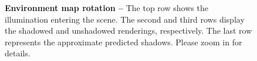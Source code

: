 \begin{figure}[!t]
  \centering
  \rotatingfigure
  \caption{\textbf{Environment map rotation --}
    The top row shows the illumination entering the scene.
    The second and third rows display the shadowed and unshadowed renderings,
    respectively.
    The last row represents the approximate predicted shadows.
    Please zoom in for details.
  }
  \label{fig:lumigauss-rotate_light}
\end{figure}